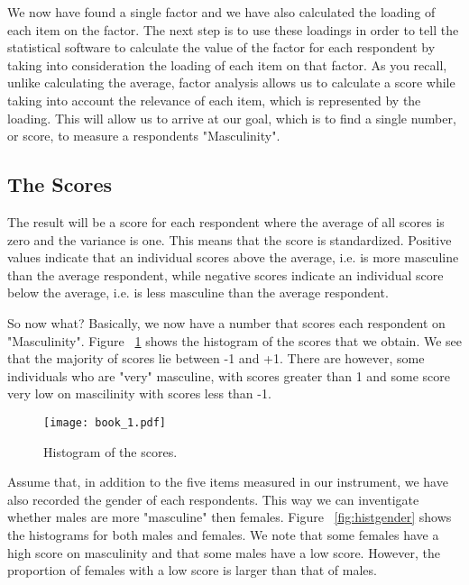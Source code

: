 \documentclass[a4paper,12pt,oneside]{book}
\begin{document}
We now have found a single factor and we have also calculated the loading of each item on the factor. The next step is to use these loadings
in order to tell the statistical software to calculate the value of the factor for each respondent by taking into consideration the loading of 
each item on that factor. As you recall, unlike calculating the average, factor analysis allows us to calculate a score while taking into account
the relevance of each item, which is represented by the loading. This will allow us to arrive at our goal, which is to find a single number, or score,
to measure a respondents "Masculinity". 

\subsection{The Scores}
The result will be a score for each respondent where the average of all scores is zero and the variance is one. This means that the score is 
standardized. Positive values indicate that an individual scores above the average, i.e. is more masculine than the average respondent, while 
negative scores indicate an individual score below the average, i.e. is less masculine than the average respondent.

So now what? Basically, we now have a number that scores each respondent on "Masculinity". Figure ~\ref{fig:hist1} shows the histogram of the scores
that we obtain. We see that the majority of scores lie between -1 and +1. There are however, some individuals who are "very" masculine, with scores
greater than 1 and some score very low on mascilinity with scores less than -1. 

\begin{stlog}\end{stlog}
\begin{figure}[h]
    \centering
    \texttt{[image: book\_1.pdf]}
    \caption{Histogram of the scores.}
    \label{fig:hist1}
\end{figure}

Assume that, in addition to the five items measured in our instrument, we have also recorded the gender of each respondents. This way we can 
inventigate whether males are more "masculine" then females. Figure ~\ref{fig:histgender} shows the histograms for both males and females. We note
that some females have a high score on masculinity and that some males have a low score. However, the proportion of females with a low score is
larger than that of males. 
\end{document}
